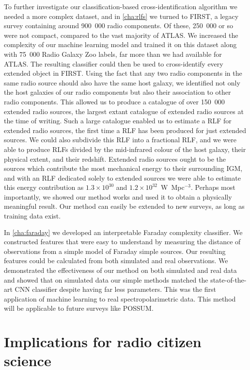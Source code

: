 To further investigate our classification-based cross-identification algorithm we needed a more complex dataset, and in \autoref{cha:rlfs} we turned to FIRST, a legacy survey containing around 900~000 radio components. Of these, 250~000 or so were not compact, compared to the vast majority of ATLAS. We increased the complexity of our machine learning model and trained it on this dataset along with 75~000 Radio Galaxy Zoo labels, far more than we had available for ATLAS. The resulting classifier could then be used to cross-identify every extended object in FIRST. Using the fact that any two radio components in the same radio source should also have the same host galaxy, we identified not only the host galaxies of our radio components but also their association to other radio components. This allowed us to produce a catalogue of over 150~000 extended radio sources, the largest extant catalogue of extended radio sources at the time of writing. Such a large catalogue enabled us to estimate a RLF for extended radio sources, the first time a RLF has been produced for just extended sources. We could also subdivide this RLF into a fractional RLF, and we were able to produce RLFs divided by the mid-infrared colour of the host galaxy, their physical extent, and their redshift. Extended radio sources ought to be the sources which contribute the most mechanical energy to their surrounding IGM, and with an RLF dedicated solely to extended sources we were able to estimate this energy contribution as $1.3 \times 10^{30}$ and $1.2 \times 10^{32}$~W~Mpc$^{-3}$. Perhaps most importantly, we showed our method works and used it to obtain a physically meaningful result. Our method can easily be extended to new surveys, as long as training data exist.

In \autoref{cha:faraday} we developed an interpretable Faraday complexity classifier. We constructed features that were easy to understand by measuring the distance of observations from a simple model of Faraday simple sources. Our resulting features could be calculated from both simulated and real observations. We demonstrated the effectiveness of our method on both simulated and real data and showed that on simulated data our simple methods matched the state-of-the-art CNN classifier despite having far less parameters. This was the first application of machine learning to real spectropolarimetric data. This method will be applicable to future surveys like POSSUM.

\section{Implications for radio citizen science}
\label{sec:implications-citizen-science}

